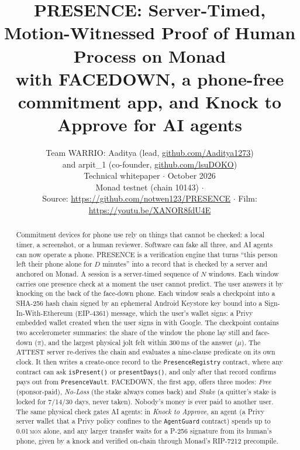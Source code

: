 \documentclass[10pt]{article}
\title{\vspace{-1em}\textbf{PRESENCE: Server-Timed, Motion-Witnessed Proof of Human Process on Monad}\\[4pt]
\large with FACEDOWN, a phone-free commitment app, and Knock to Approve for AI agents}
\author{Team WARRIO: Aaditya (lead, \href{https://github.com/Aaditya1273}{github.com/Aaditya1273})\\ and
arpit\_1 (co-founder, \href{https://github.com/lsuDOKO}{github.com/lsuDOKO})\\[2pt]
\small Technical whitepaper \;$\cdot$\; 15 October 2026\\
\small Monad testnet (chain 10143) \;$\cdot$\; \code{PresenceRegistry} \code{0x5519dacf\ldots E52B}\\
\small Source: \url{https://github.com/notwen123/PRESENCE} \;$\cdot$\; Film: \url{https://youtu.be/XANOR8fdU4E}}
\date{}
\newcommand{\code}[1]{\texttt{\small #1}}
\newcommand{\mon}{\textsc{mon}}
\begin{document}
\maketitle
\vspace{-1.6em}

\begin{abstract}
\noindent Commitment devices for phone use rely on things that cannot be checked: a local timer, a screenshot, or a human
reviewer. Software can fake all three, and AI agents can now operate a phone. PRESENCE is a verification engine that
turns ``this person left their phone alone for $D$ minutes'' into a record that is checked by a server and anchored on
Monad. A session is a server-timed sequence of $N$ windows. Each window carries one presence check at a moment the user
cannot predict. The user answers it by knocking on the back of the face-down phone. Each window seals a checkpoint into a
SHA-256 hash chain signed by an ephemeral Android Keystore key bound into a Sign-In-With-Ethereum (EIP-4361) message,
which the user's wallet signs: a Privy embedded wallet created when the user signs in with Google. The checkpoint
contains two accelerometer summaries: the share of the window the phone lay still and face-down ($\pi$), and the largest
physical jolt felt within 300\,ms of the answer ($\mu$). The ATTEST server re-derives the chain and evaluates a
nine-clause predicate on its own clock. It then writes a create-once record to the \code{PresenceRegistry} contract,
where any contract can ask \code{isPresent()} or \code{presentDays()}, and only after that record confirms pays out from
\code{PresenceVault}. FACEDOWN, the first app, offers three modes: \emph{Free} (sponsor-paid), \emph{No-Loss} (the stake
always comes back) and \emph{Stake} (a quitter's stake is locked for 7/14/30 days, never taken). Nobody's money is ever
paid to another user. The same physical check gates AI agents: in \emph{Knock to Approve}, an agent (a Privy server
wallet that a Privy policy confines to the \code{AgentGuard} contract) spends up to 0.01\,\mon{} alone, and any larger
transfer waits for a P-256 signature from its human's phone, given by a knock and verified on-chain through Monad's
RIP-7212 precompile.


\end{abstract}
\end{document}
